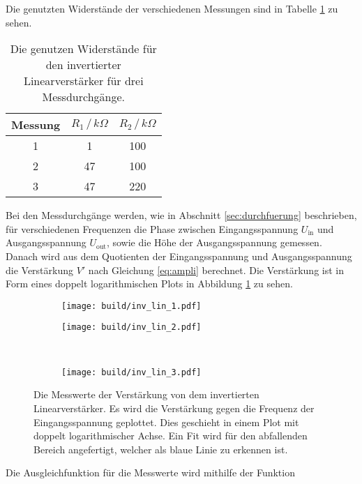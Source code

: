 Die genutzten Widerstände der verschiedenen Messungen sind in Tabelle \ref{tab:wider_inv_lin} zu sehen.
\begin{table}
    \centering
    \begin{tabular}{ccc}
        \toprule
        Messung & $R_1 \, / \, k\Omega $ & $R_2 \, / \,  k\Omega $ \\
        \midrule 
        1 & 1 & 100 \\
        2 & 47 & 100 \\
        3 & 47 & 220 \\
        \bottomrule
    \end{tabular}
    \caption{Die genutzen Widerstände für den invertierter Linearverstärker für drei Messdurchgänge.}
    \label{tab:wider_inv_lin}
\end{table}
Bei den Messdurchgänge werden, wie in Abschnitt \ref{sec:durchfuerung} beschrieben, für verschiedenen Frequenzen die Phase zwischen Eingangsspannung $U_\text{in}$ und Ausgangsspannung $U_\text{out}$, sowie die Höhe der Ausgangsspannung gemessen.
Danach wird aus dem Quotienten der Eingangsspannung und Ausgangsspannung die Verstärkung $V'$ nach Gleichung \ref{eq:ampli} berechnet.
Die Verstärkung ist in Form eines doppelt logarithmischen Plots in Abbildung \ref{fig:inv_lin} zu sehen.
\begin{figure}
    \centering
    \begin{subfigure}{0.49\linewidth}%
        \texttt{[image: build/inv\_lin\_1.pdf]}
    \end{subfigure}
    \hfill
    \begin{subfigure}{0.49\linewidth}%
        \texttt{[image: build/inv\_lin\_2.pdf]}
    \end{subfigure}\\
    \begin{subfigure}{0.49\linewidth}%
        \texttt{[image: build/inv\_lin\_3.pdf]}
    \end{subfigure}
    \caption{Die Messwerte der Verstärkung von dem invertierten Linearverstärker. Es wird die Verstärkung gegen die Frequenz der Eingangsspannung geplottet.
    Dies geschieht in einem Plot mit doppelt logarithmischer Achse. Ein Fit wird für den abfallenden Bereich angefertigt, welcher als blaue Linie zu erkennen ist.}
    \label{fig:inv_lin}
\end{figure}
Die Ausgleichfunktion für die Messwerte wird mithilfe der Funktion
